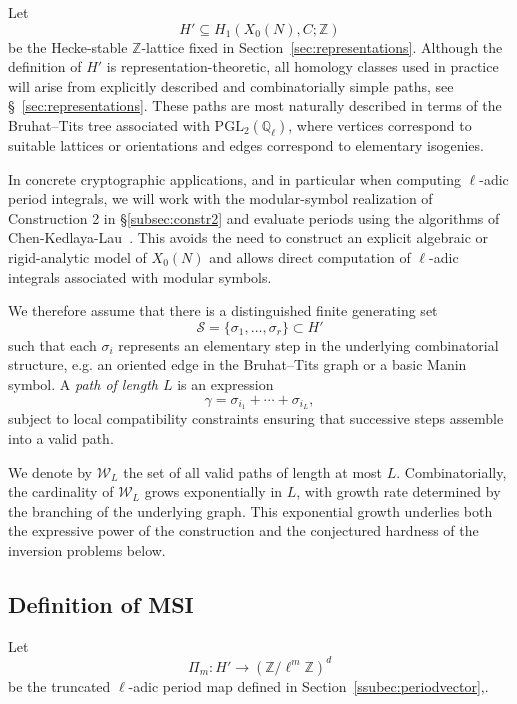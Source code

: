 \documentclass[10pt]{amsart}
\theoremstyle{theostyle}
\newcommand{\QQ}{\mathbb{Q}} \newcommand{\RR}{\mathbb{R}}
\newcommand{\ZZ}{\mathbb{Z}}
\newcommand{\PGL}{\mathrm{PGL}}
\begin{document}
Let
\[
H' \subseteq H_1(X_0(N),C;\ZZ)
\]
be the Hecke-stable $\ZZ$-lattice fixed in
Section~\ref{sec:representations}. Although the definition of $H'$ is
representation-theoretic, all homology classes used in practice will arise
from explicitly described and combinatorially simple paths, see \S~\ref{sec:representations}. These paths are most naturally described in terms of the Bruhat--Tits tree associated with $\PGL_2(\QQ_\ell)$, where
vertices correspond to suitable lattices or orientations and edges correspond
to elementary isogenies. 

In concrete cryptographic applications, and in particular when computing
$\ell$-adic period integrals, we will work with the modular-symbol
realization of Construction 2 in \S\ref{subsec:constr2} and evaluate periods using the algorithms of
Chen-Kedlaya-Lau~\cite{CKL}. This avoids the need to construct an
explicit algebraic or rigid-analytic model of $X_0(N)$ and allows direct
computation of $\ell$-adic integrals associated with modular symbols.

We therefore assume that there is a distinguished finite generating set $$\mathcal S = \{\sigma_1,\dots,\sigma_r\} \subset H'$$
such that each $\sigma_i$ represents an elementary step in the
underlying combinatorial structure, e.g.\; an oriented edge in the
Bruhat--Tits graph or a basic Manin symbol. A \emph{path of length $L$} is an
expression
\[
\gamma = \sigma_{i_1} + \cdots + \sigma_{i_L},
\]
subject to local compatibility constraints ensuring that successive steps
assemble into a valid path.

We denote by $\mathcal W_L$ the set of all valid paths of length at most $L$.
Combinatorially, the cardinality of $\mathcal W_L$ grows exponentially in $L$,
with growth rate determined by the branching of the underlying graph. This
exponential growth underlies both the expressive power of the construction
and the conjectured hardness of the inversion problems below.

\subsection{Definition of MSI}

Let
\[
\Pi_m : H' \longrightarrow (\ZZ/\ell^m\ZZ)^d
\]
be the truncated $\ell$-adic period map defined in
Section~\ref{ssubec:periodvector},.
\end{document}
